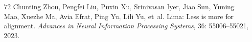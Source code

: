 \begin{thebibliography}{72}
Chunting Zhou, Pengfei Liu, Puxin Xu, Srinivasan Iyer, Jiao Sun, Yuning Mao, Xuezhe Ma, Avia Efrat, Ping Yu, Lili Yu, et~al.
\newblock Lima: Less is more for alignment.
\newblock \emph{Advances in Neural Information Processing Systems}, 36: 55006--55021, 2023.

\end{thebibliography}
